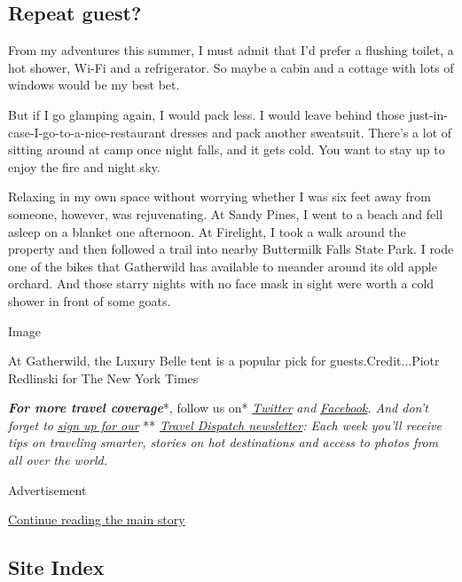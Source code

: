 \hypertarget{repeat-guest}{%
\subsection{Repeat guest?}\label{repeat-guest}}

From my adventures this summer, I must admit that I'd prefer a flushing
toilet, a hot shower, Wi-Fi and a refrigerator. So maybe a cabin and a
cottage with lots of windows would be my best bet.

But if I go glamping again, I would pack less. I would leave behind
those just-in-case-I-go-to-a-nice-restaurant dresses and pack another
sweatsuit. There's a lot of sitting around at camp once night falls, and
it gets cold. You want to stay up to enjoy the fire and night sky.

Relaxing in my own space without worrying whether I was six feet away
from someone, however, was rejuvenating. At Sandy Pines, I went to a
beach and fell asleep on a blanket one afternoon. At Firelight, I took a
walk around the property and then followed a trail into nearby
Buttermilk Falls State Park. I rode one of the bikes that Gatherwild has
available to meander around its old apple orchard. And those starry
nights with no face mask in sight were worth a cold shower in front of
some goats.

Image

At Gatherwild, the Luxury Belle tent is a popular pick for
guests.Credit...Piotr Redlinski for The New York Times

\emph{\textbf{For more travel coverage}}*, follow us on*
\href{https://twitter.com/nytimestravel}{\emph{Twitter}} \emph{and}
\href{https://www.facebookcorewwwi.onion/nytimestravel/}{\emph{Facebook}}\emph{.
And don't forget to}
\href{https://www.nytimes3xbfgragh.onion/newsletters/traveldispatch?action=click\&module=inline\&pgtype=Article}{\emph{sign
up for our}} **
\href{https://www.nytimes3xbfgragh.onion/newsletters/traveldispatch}{\emph{Travel
Dispatch newsletter}}\emph{: Each week you'll receive tips on traveling
smarter, stories on hot destinations and access to photos from all over
the world.}

Advertisement

\protect\hyperlink{after-bottom}{Continue reading the main story}

\hypertarget{site-index}{%
\subsection{Site Index}\label{site-index}}

